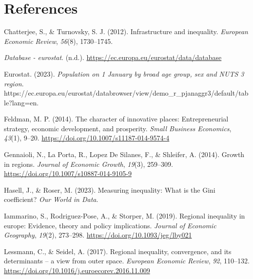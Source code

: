 \documentclass[
  a4paper,
  DIV=11,
  numbers=noendperiod]{scrartcl}
\newlength{\cslhangindent}
\newlength{\cslentryspacingunit} %
\newenvironment{CSLReferences}[2] %
 {%
  \setlength{\parindent}{0pt}
  \ifodd #1
  \let\oldpar\par
  \def\par{\hangindent=\cslhangindent\oldpar}
  \fi
  \setlength{\parskip}{#2\cslentryspacingunit}
 }%
 {}
\begin{document}
\hypertarget{references}{%
\section*{References}\label{references}}

\hypertarget{refs}{}
\begin{CSLReferences}{1}{0}
\leavevmode{}%
Chatterjee, S., \& Turnovsky, S. J. (2012). Infrastructure and
inequality. \emph{European Economic Review}, \emph{56}(8), 1730--1745.

\leavevmode{}%
\emph{Database - eurostat}. (n.d.).
\url{https://ec.europa.eu/eurostat/data/database}

\leavevmode{}%
Eurostat. (2023). \emph{Population on 1 {January} by broad age group,
sex and {NUTS} 3 region}.
https://ec.europa.eu/eurostat/databrowser/view/demo\_r\_pjanaggr3/default/table?lang=en.

\leavevmode{}%
Feldman, M. P. (2014). The character of innovative places:
Entrepreneurial strategy, economic development, and prosperity.
\emph{Small Business Economics}, \emph{43}(1), 9--20.
\url{https://doi.org/10.1007/s11187-014-9574-4}

\leavevmode{}%
Gennaioli, N., La Porta, R., Lopez De Silanes, F., \& Shleifer, A.
(2014). Growth in regions. \emph{Journal of Economic Growth},
\emph{19}(3), 259--309. \url{https://doi.org/10.1007/s10887-014-9105-9}

\leavevmode{}%
Hasell, J., \& Roser, M. (2023). Measuring inequality: {What} is the
{Gini} coefficient? \emph{Our World in Data}.

\leavevmode{}%
Iammarino, S., Rodriguez-Pose, A., \& Storper, M. (2019). Regional
inequality in europe: Evidence, theory and policy implications.
\emph{Journal of Economic Geography}, \emph{19}(2), 273--298.
\url{https://doi.org/10.1093/jeg/lby021}

\leavevmode{}%
Lessmann, C., \& Seidel, A. (2017). Regional inequality, convergence,
and its determinants -- a view from outer space. \emph{European Economic
Review}, \emph{92}, 110--132.
\url{https://doi.org/10.1016/j.euroecorev.2016.11.009}


\end{CSLReferences}
\end{document}
